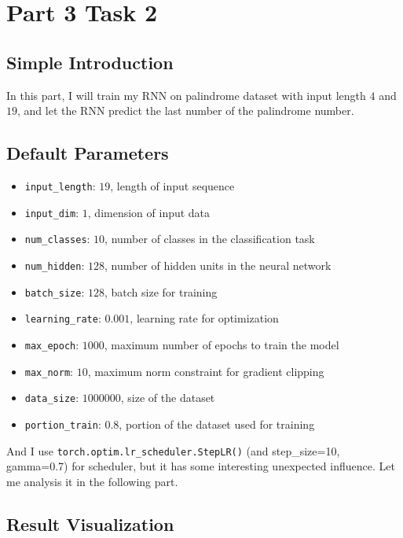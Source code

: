 \section{Part 3 Task 2}

\subsection{Simple Introduction}

In this part, I will train my RNN on palindrome dataset with input length $4$ and $19$, and let the RNN predict the last number of the palindrome number.

\subsection{Default Parameters}

\begin{itemize}
  \item \texttt{input\_length}: $19$, length of input sequence
  \item \texttt{input\_dim}: $1$, dimension of input data
  \item \texttt{num\_classes}: $10$, number of classes in the classification task
  \item \texttt{num\_hidden}: $128$, number of hidden units in the neural network
  \item \texttt{batch\_size}: $128$, batch size for training
  \item \texttt{learning\_rate}: $0.001$, learning rate for optimization
  \item \texttt{max\_epoch}: $1000$, maximum number of epochs to train the model
  \item \texttt{max\_norm}: $10$, maximum norm constraint for gradient clipping
  \item \texttt{data\_size}: $1000000$, size of the dataset
  \item \texttt{portion\_train}: $0.8$, portion of the dataset used for training
\end{itemize}

And I use \texttt{torch.optim.lr\_scheduler.StepLR()} (and step\_size=10, gamma=0.7) for scheduler, but it has some interesting unexpected influence.
Let me analysis it in the following part.

\subsection{Result Visualization}


